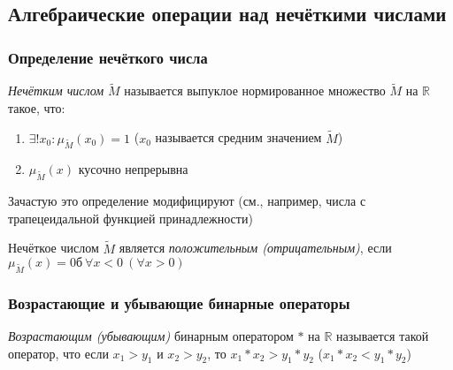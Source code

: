 \documentclass{beamer}
\begin{document}
\subsection{Алгебраические операции над нечёткими числами}

\begin{frame}\frametitle{Определение нечёткого числа}
    \begin{definition}
        \textit{Нечётким числом} $\tilde{M}$ называется выпуклое нормированное множество $\tilde{M}$ на $\mathbb{R}$ такое, что:
        \begin{enumerate}
            \item $\exists ! x_0: \mu_{\tilde{M}}(x_0) = 1$ ($x_0$ называется средним значением $\tilde{M}$)
            \item $\mu_{\tilde{M}}(x)$ кусочно непрерывна
        \end{enumerate}
    \end{definition}
    Зачастую это определение модифицируют (см., например, числа с трапецеидальной функцией принадлежности)
    \begin{definition}
        Нечёткое числом $\tilde{M}$ является \textit{положительным (отрицательным)}, если $\mu_{\tilde{M}}(x) = 0б\ \forall x < 0\ (\forall x > 0)$ 
    \end{definition}
\end{frame}

\begin{frame}\frametitle{Возрастающие и убывающие бинарные операторы}
    \begin{definition}
        \textit{Возрастающим (убывающим)} бинарным оператором $*$ на $\mathbb{R}$ называется такой оператор, что если $x_1 > y_1$ и $x_2 > y_2$, то $x_1 * x_2 > y_1 * y_2$ ($x_1 * x_2 < y_1 * y_2$)
    \end{definition}
\end{frame}
\end{document}
